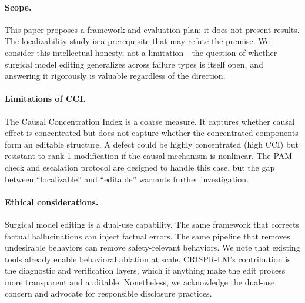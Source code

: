 \documentclass[11pt]{article}
\begin{document}
\paragraph{Scope.} This paper proposes a framework and evaluation plan; it does not present results. The localizability study is a prerequisite that may refute the premise. We consider this intellectual honesty, not a limitation---the question of whether surgical model editing generalizes across failure types is itself open, and answering it rigorously is valuable regardless of the direction.

\paragraph{Limitations of CCI.} The Causal Concentration Index is a coarse measure. It captures whether causal effect is concentrated but does not capture whether the concentrated components form an editable structure. A defect could be highly concentrated (high CCI) but resistant to rank-1 modification if the causal mechanism is nonlinear. The PAM check and escalation protocol are designed to handle this case, but the gap between ``localizable'' and ``editable'' warrants further investigation.

\paragraph{Ethical considerations.} Surgical model editing is a dual-use capability. The same framework that corrects factual hallucinations can inject factual errors. The same pipeline that removes undesirable behaviors can remove safety-relevant behaviors. We note that existing tools \citep{heretic2024,obliteratus2024} already enable behavioral ablation at scale. CRISPR-LM's contribution is the diagnostic and verification layers, which if anything make the edit process more transparent and auditable. Nonetheless, we acknowledge the dual-use concern and advocate for responsible disclosure practices.


\end{document}
